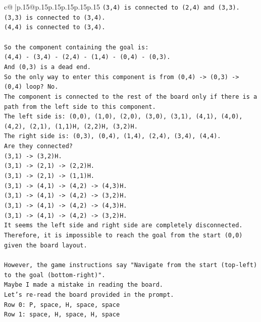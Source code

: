 \documentclass{article}
\begin{document}
{\begin{supertabular}{c@{$\;$}|p{.15\linewidth}@{}p{.15\linewidth}p{.15\linewidth}p{.15\linewidth}p{.15\linewidth}p{.15\linewidth}}
{{{\texttt{(3,4) is connected to (2,4) and (3,3).} \\
\texttt{(3,3) is connected to (3,4).} \\
\texttt{(4,4) is connected to (3,4).} \\
\\ 
\texttt{So the component containing the goal is:} \\
\texttt{(4,4) {-} (3,4) {-} (2,4) {-} (1,4) {-} (0,4) {-} (0,3).} \\
\texttt{And (0,3) is a dead end.} \\
\texttt{So the only way to enter this component is from (0,4) {-}> (0,3) {-}> (0,4) loop? No.} \\
\texttt{The component is connected to the rest of the board only if there is a path from the left side to this component.} \\
\texttt{The left side is: (0,0), (1,0), (2,0), (3,0), (3,1), (4,1), (4,0), (4,2), (2,1), (1,1)H, (2,2)H, (3,2)H.} \\
\texttt{The right side is: (0,3), (0,4), (1,4), (2,4), (3,4), (4,4).} \\
\texttt{Are they connected?} \\
\texttt{(3,1) {-}> (3,2)H.} \\
\texttt{(3,1) {-}> (2,1) {-}> (2,2)H.} \\
\texttt{(3,1) {-}> (2,1) {-}> (1,1)H.} \\
\texttt{(3,1) {-}> (4,1) {-}> (4,2) {-}> (4,3)H.} \\
\texttt{(3,1) {-}> (4,1) {-}> (4,2) {-}> (3,2)H.} \\
\texttt{(3,1) {-}> (4,1) {-}> (4,2) {-}> (4,3)H.} \\
\texttt{(3,1) {-}> (4,1) {-}> (4,2) {-}> (3,2)H.} \\
\texttt{It seems the left side and right side are completely disconnected.} \\
\texttt{Therefore, it is impossible to reach the goal from the start (0,0) given the board layout.} \\
\\ 
\texttt{However, the game instructions say "Navigate from the start (top{-}left) to the goal (bottom{-}right)".} \\
\texttt{Maybe I made a mistake in reading the board.} \\
\texttt{Let's re{-}read the board provided in the prompt.} \\
\texttt{Row 0: P, space, H, space, space} \\
\texttt{Row 1: space, H, space, H, space} \\
}}}
\end{supertabular}}
\end{document}
